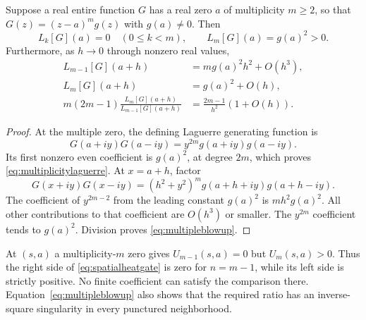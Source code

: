 \begin{lemma}
\label{lem:multiplicitylaguerre}
Suppose a real entire function $G$ has a real
zero $a$ of multiplicity $m\ge2$, so that
$G(z)=(z-a)^m g(z)$ with $g(a)\ne0$.
Then
\begin{equation}
L_k[G](a)=0\quad(0\le k<m),\qquad
L_m[G](a)=g(a)^2>0.
\label{eq:multiplicitylaguerre}
\end{equation}
Furthermore, as $h\to0$ through nonzero real
values,
\begin{align}
L_{m-1}[G](a+h)&=
m g(a)^2h^2+O(h^3),\nonumber\\
L_m[G](a+h)&=g(a)^2+O(h),\nonumber\\
m(2m-1)\frac{L_m[G](a+h)}
{L_{m-1}[G](a+h)}
&=\frac{2m-1}{h^2}(1+O(h)).
\label{eq:multipleblowup}
\end{align}
\end{lemma}
\begin{proof}
At the multiple zero, the defining
Laguerre generating function is
\[
G(a+iy)G(a-iy)
=y^{2m}g(a+iy)g(a-iy).
\]
Its first nonzero even coefficient is
$g(a)^2$, at degree $2m$,
which proves \eqref{eq:multiplicitylaguerre}.
At $x=a+h$, factor
\[
G(x+iy)G(x-iy)
=(h^2+y^2)^m g(a+h+iy)g(a+h-iy).
\]
The coefficient of $y^{2m-2}$
from the leading constant $g(a)^2$
is $m h^2g(a)^2$.
All other contributions to that
coefficient are $O(h^3)$ or smaller.
The $y^{2m}$ coefficient tends to
$g(a)^2$.
Division proves \eqref{eq:multipleblowup}.
\end{proof}

At $(s,a)$ a multiplicity-$m$ zero gives
$U_{m-1}(s,a)=0$ but $U_m(s,a)>0$.
Thus the right side of
\eqref{eq:spatialheatgate} is zero
for $n=m-1$, while its left side is
strictly positive. No finite coefficient
can satisfy the comparison there.
Equation~\eqref{eq:multipleblowup}
also shows that the required ratio
has an inverse-square singularity
in every punctured neighborhood.

